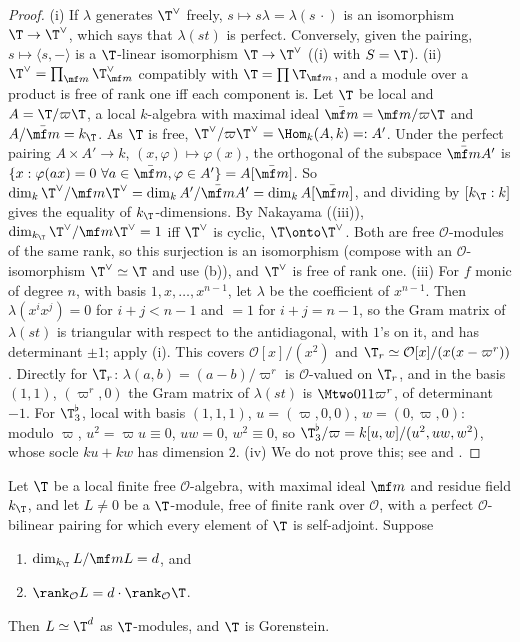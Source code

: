 \begin{proof}
(i) If $\lambda$ generates $\T^\vee$ freely, $s\mapsto s\lambda=\lambda(s\,\cdot)$ is an isomorphism $\T\to\T^\vee$, which says that $\lambda(st)$ is perfect. Conversely, given the
pairing, $s\mapsto\langle s,-\rangle$ is a $\T$-linear isomorphism $\T\to\T^\vee$ ((i) with $S=\T$).
(ii) $\T^\vee=\prod_{\mf m}\T_{\mf m}^\vee$ compatibly with $\T=\prod\T_{\mf m}$, and a module over a product is free of rank one iff each component is. Let $\T$ be local and
$A=\T/\varpi\T$, a local $k$-algebra with maximal ideal $\bar{\mf m}=\mf m/\varpi\T$ and $A/\bar{\mf m}=k_\T$. As $\T$ is free, $\T^\vee/\varpi\T^\vee=\Hom_k(A,k)=:A'$. Under the
perfect pairing $A\times A'\to k$, $(x,\varphi)\mapsto\varphi(x)$, the orthogonal of the subspace $\bar{\mf m}A'$ is $\{x:\varphi(ax)=0\ \forall a\in\bar{\mf m},\varphi\in A'\}=A[\bar{\mf m}]$. So
$\dim_k\T^\vee/\mf m\T^\vee=\dim_kA'/\bar{\mf m}A'=\dim_kA[\bar{\mf m}]$, and dividing by $[k_\T:k]$ gives the equality of $k_\T$-dimensions. By Nakayama
((iii)), $\dim_{k_\T}\T^\vee/\mf m\T^\vee=1$ iff $\T^\vee$ is cyclic, $\T\onto\T^\vee$. Both are free $\mathcal O$-modules of the same rank, so this surjection is an
isomorphism (compose with an $\mathcal O$-isomorphism $\T^\vee\simeq\T$ and use (b)), and $\T^\vee$ is free of rank one.
(iii) For $f$ monic of degree $n$, with basis $1,x,\dots,x^{n-1}$, let $\lambda$ be the coefficient of $x^{n-1}$. Then $\lambda(x^ix^j)=0$ for $i+j<n-1$ and $=1$ for $i+j=n-1$,
so the Gram matrix of $\lambda(st)$ is triangular with respect to the antidiagonal, with $1$'s on it, and has determinant $\pm1$; apply (i). This covers $\mathcal O[x]/(x^2)$
and $\T_r\simeq\mathcal O[x]/(x(x-\varpi^r))$. Directly for $\T_r$: $\lambda(a,b)=(a-b)/\varpi^r$ is $\mathcal O$-valued on $\T_r$, and in the basis $(1,1)$, $(\varpi^r,0)$ the Gram matrix of
$\lambda(st)$ is $\Mtwo011{\varpi^r}$, of determinant $-1$. For $\T^\flat_3$, local with basis $(1,1,1)$, $u=(\varpi,0,0)$, $w=(0,\varpi,0)$: modulo $\varpi$, $u^2=\varpi u\equiv0$,
$uw=0$, $w^2\equiv0$, so $\T^\flat_3/\varpi=k[u,w]/(u^2,uw,w^2)$, whose socle $ku+kw$ has dimension $2$.
(iv) We do not prove this; see \cite[Chapter 21]{Eisenbud} and \cite[Section 4]{DDT}.
\end{proof}

\begin{theorem}\label{thm:modules:mazur-freeness}
Let $\T$ be a local finite free $\mathcal O$-algebra, with maximal ideal $\mf m$ and residue field $k_\T$, and let $L\ne0$ be a $\T$-module, free of finite rank over $\mathcal O$, with a
perfect $\mathcal O$-bilinear pairing for which every element of $\T$ is self-adjoint. Suppose
\begin{enumerate}[label=(\alph*)]
\item $\dim_{k_\T}L/\mf mL=d$, and
\item $\rank_{\mathcal O}L=d\cdot\rank_{\mathcal O}\T$.
\end{enumerate}
Then $L\simeq\T^d$ as $\T$-modules, and $\T$ is Gorenstein.
\end{theorem}

